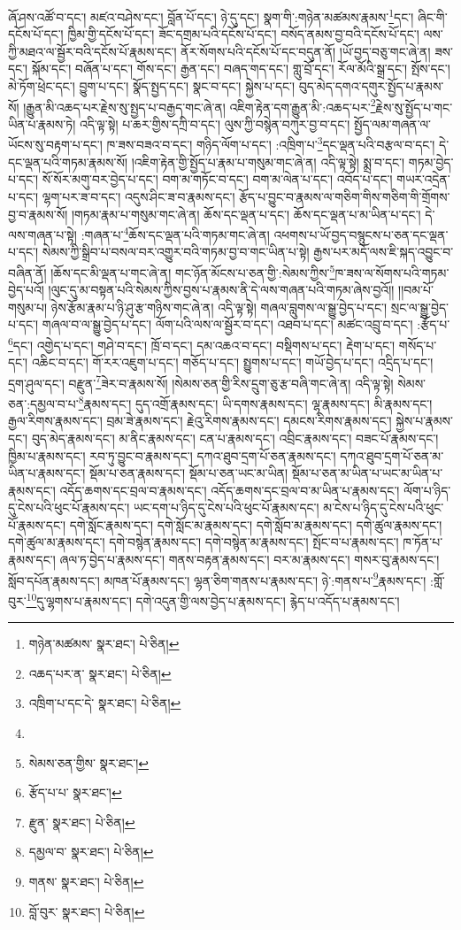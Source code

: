 ཞོ་ཤས་འཚོ་བ་དང་། མཛའ་བཤེས་དང་། བློན་པོ་དང་། ཉེ་དུ་དང་། སྣག་གི་:གཉེན་མཚམས་རྣམས་\footnote{གཉེན་མཚམས་  སྣར་ཐང་།  པེ་ཅིན། }དང་། ཞིང་གི་དངོས་པོ་དང་། ཁྱིམ་གྱི་དངོས་པོ་དང་། ཟོང་དགྲམ་པའི་དངོས་པོ་དང་། བསོད་ནམས་བྱ་བའི་དངོས་པོ་དང་། ལས་ཀྱི་མཐའ་ལ་སྦྱོར་བའི་དངོས་པོ་རྣམས་དང་། ནོར་སོགས་པའི་དངོས་པོ་དང་བདུན་ནོ། །ཡོ་བྱད་བཅུ་གང་ཞེ་ན། ཟས་དང་། སྐོམ་དང་། བཞོན་པ་དང་། གོས་དང་། རྒྱན་དང་། བཞད་གད་དང་། གླུ་བྲོ་དང་། རོལ་མོའི་སྒྲ་དང་། སྤོས་དང་། མེ་ཏོག་ཕྲེང་དང་། བྱུག་པ་དང་། སྣོད་སྤྱད་དང་། སྣང་བ་དང་། སྐྱེས་པ་དང་། བུད་མེད་དགའ་དགུར་སྤྱོད་པ་རྣམས་སོ། །རྒྱུན་མི་འཆད་པར་རྗེས་སུ་སྤྱད་པ་བརྒྱད་གང་ཞེ་ན། འཇིག་རྟེན་དག་རྒྱུན་མི་:འཆད་པར་\footnote{འཆད་པར་ན་  སྣར་ཐང་།  པེ་ཅིན། }རྗེས་སུ་སྤྱོད་པ་གང་ཡིན་པ་རྣམས་ཏེ། འདི་ལྟ་སྟེ། པ་ཆར་གྱིས་དཀྲི་བ་དང་། ལུས་ཀྱི་བསྙེན་བཀུར་བྱ་བ་དང་། སྤྱོད་ལམ་གཞན་ལ་ཡོངས་སུ་བརྟག་པ་དང་། ཁ་ཟས་བཟའ་བ་དང་། གཉིད་ལོག་པ་དང་། :འཁྲིག་པ་\footnote{འཁྲིག་པ་དང་དེ་  སྣར་ཐང་།  པེ་ཅིན། }དང་ལྡན་པའི་བརྩལ་བ་དང་། དེ་དང་ལྡན་པའི་གཏམ་རྣམས་སོ། །འཇིག་རྟེན་གྱི་སྤྱོད་པ་རྣམ་པ་གསུམ་གང་ཞེ་ན། འདི་ལྟ་སྟེ། སྨྲ་བ་དང་། གཏམ་བྱེད་པ་དང་། སོ་སོར་མགུ་བར་བྱེད་པ་དང་། བག་མ་གཏོང་བ་དང་། བག་མ་ལེན་པ་དང་། འབོད་པ་དང་། གཡར་འདྲེན་པ་དང་། ལྷག་པར་ཟ་བ་དང་། འདུས་ཤིང་ཟ་བ་རྣམས་དང་། རྩོད་པ་བྱུང་བ་རྣམས་ལ་གཅིག་གིས་གཅིག་གི་གྲོགས་བྱ་བ་རྣམས་སོ། །གཏམ་རྣམ་པ་གསུམ་གང་ཞེ་ན། ཆོས་དང་ལྡན་པ་དང་། ཆོས་དང་ལྡན་པ་མ་ཡིན་པ་དང་། དེ་ལས་གཞན་པ་སྟེ། :གཞན་པ་\footnote{}ཆོས་དང་ལྡན་པའི་གཏམ་གང་ཞེ་ན། འཕགས་པ་ཡོ་བྱད་བསྙུངས་པ་ཅན་དང་ལྡན་པ་དང་། སེམས་ཀྱི་སྒྲིབ་པ་བསལ་བར་འགྱུར་བའི་གཏམ་བྱ་བ་གང་ཡིན་པ་སྟེ། རྒྱས་པར་མདོ་ལས་ཇི་སྐད་འབྱུང་བ་བཞིན་ནོ། །ཆོས་དང་མི་ལྡན་པ་གང་ཞེ་ན། གང་ཉོན་མོངས་པ་ཅན་གྱི་:སེམས་ཀྱིས་\footnote{སེམས་ཅན་གྱིས་  སྣར་ཐང་། }ཁ་ཟས་ལ་སོགས་པའི་གཏམ་བྱེད་པའོ། །ལུང་དུ་མ་བསྟན་པའི་སེམས་ཀྱིས་བྱས་པ་རྣམས་ནི་དེ་ལས་གཞན་པའི་གཏམ་ཞེས་བྱའོ།། །།བམ་པོ་གསུམ་པ། ཉེས་རྩོམ་རྣམ་པ་ཉི་ཤུ་རྩ་གཉིས་གང་ཞེ་ན། འདི་ལྟ་སྟེ། གཞལ་བླུགས་ལ་སྒྱུ་བྱེད་པ་དང་། སྲང་ལ་སྒྱུ་བྱེད་པ་དང་། གཞལ་བ་ལ་སྒྱུ་བྱེད་པ་དང་། ལོག་པའི་ལས་ལ་སྦྱོར་བ་དང་། འཐབ་པ་དང་། མཚང་འབྲུ་བ་དང་། :རྩོད་པ་\footnote{རྩོད་པ་པ་  སྣར་ཐང་། }དང་། འགྱེད་པ་དང་། གཤེ་བ་དང་། ཁྲོ་བ་དང་། དམ་འཆའ་བ་དང་། བསྡིགས་པ་དང་། རྡེག་པ་དང་། གསོད་པ་དང་། འཆིང་བ་དང་། གོ་རར་འཇུག་པ་དང་། གཅོད་པ་དང་། སྤྱུགས་པ་དང་། གཡོ་བྱེད་པ་དང་། འདྲིད་པ་དང་། དྲག་ཤུལ་དང་། བརྫུན་\footnote{རྫུན་  སྣར་ཐང་།  པེ་ཅིན། }ཟེར་བ་རྣམས་སོ། །སེམས་ཅན་གྱི་རིས་དྲུག་ཅུ་རྩ་བཞི་གང་ཞེ་ན། འདི་ལྟ་སྟེ། སེམས་ཅན་:དམྱལ་བ་པ་\footnote{དམྱལ་བ་  སྣར་ཐང་།  པེ་ཅིན། }རྣམས་དང་། དུད་འགྲོ་རྣམས་དང་། ཡི་དགས་རྣམས་དང་། ལྷ་རྣམས་དང་། མི་རྣམས་དང་། རྒྱལ་རིགས་རྣམས་དང་། བྲམ་ཟེ་རྣམས་དང་། རྗེའུ་རིགས་རྣམས་དང་། དམངས་རིགས་རྣམས་དང་། སྐྱེས་པ་རྣམས་དང་། བུད་མེད་རྣམས་དང་། མ་ནིང་རྣམས་དང་། ངན་པ་རྣམས་དང་། འབྲིང་རྣམས་དང་། བཟང་པོ་རྣམས་དང་། ཁྱིམ་པ་རྣམས་དང་། རབ་ཏུ་བྱུང་བ་རྣམས་དང་། དཀའ་ཐུབ་དྲག་པོ་ཅན་རྣམས་དང་། དཀའ་ཐུབ་དྲག་པོ་ཅན་མ་ཡིན་པ་རྣམས་དང་། སྡོམ་པ་ཅན་རྣམས་དང་། སྡོམ་པ་ཅན་ཡང་མ་ཡིན། སྡོམ་པ་ཅན་མ་ཡིན་པ་ཡང་མ་ཡིན་པ་རྣམས་དང་། འདོད་ཆགས་དང་བྲལ་བ་རྣམས་དང་། འདོད་ཆགས་དང་བྲལ་བ་མ་ཡིན་པ་རྣམས་དང་། ལོག་པ་ཉིད་དུ་ངེས་པའི་ཕུང་པོ་རྣམས་དང་། ཡང་དག་པ་ཉིད་དུ་ངེས་པའི་ཕུང་པོ་རྣམས་དང་། མ་ངེས་པ་ཉིད་དུ་ངེས་པའི་ཕུང་པོ་རྣམས་དང་། དགེ་སློང་རྣམས་དང་། དགེ་སློང་མ་རྣམས་དང་། དགེ་སློབ་མ་རྣམས་དང་། དགེ་ཚུལ་རྣམས་དང་། དགེ་ཚུལ་མ་རྣམས་དང་། དགེ་བསྙེན་རྣམས་དང་། དགེ་བསྙེན་མ་རྣམས་དང་། སྤོང་བ་པ་རྣམས་དང་། ཁ་ཏོན་པ་རྣམས་དང་། ཞལ་ཏ་བྱེད་པ་རྣམས་དང་། གནས་བརྟན་རྣམས་དང་། བར་མ་རྣམས་དང་། གསར་བུ་རྣམས་དང་། སློབ་དཔོན་རྣམས་དང་། མཁན་པོ་རྣམས་དང་། ལྷན་ཅིག་གནས་པ་རྣམས་དང་། ཉེ་:གནས་པ་\footnote{གནས་  སྣར་ཐང་།  པེ་ཅིན། }རྣམས་དང་། :གློ་བུར་\footnote{བློ་བུར་  སྣར་ཐང་།  པེ་ཅིན། }དུ་ལྷགས་པ་རྣམས་དང་། དགེ་འདུན་གྱི་ལས་བྱེད་པ་རྣམས་དང་། རྙེད་པ་འདོད་པ་རྣམས་དང་། 